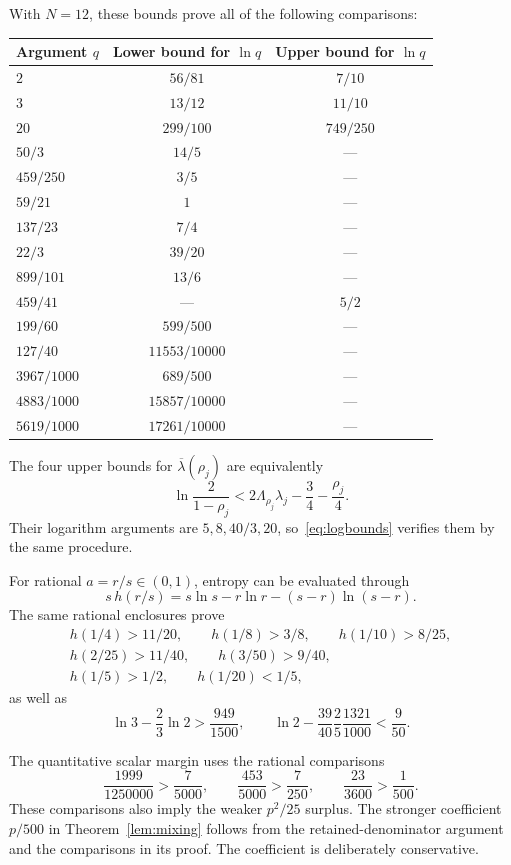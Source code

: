 With $N=12$, these bounds prove all of the following comparisons:
\begin{center}
\renewcommand{\arraystretch}{1.14}
\begin{tabular}{@{}lcc@{}}
\toprule
Argument $q$ & Lower bound for $\ln q$ & Upper bound for $\ln q$\\
\midrule
$2$ & $56/81$ & $7/10$\\
$3$ & $13/12$ & $11/10$\\
$20$ & $299/100$ & $749/250$\\
$50/3$ & $14/5$ & ---\\
$459/250$ & $3/5$ & ---\\
$59/21$ & $1$ & ---\\
$137/23$ & $7/4$ & ---\\
$22/3$ & $39/20$ & ---\\
$899/101$ & $13/6$ & ---\\
$459/41$ & --- & $5/2$\\
$199/60$ & $599/500$ & ---\\
$127/40$ & $11553/10000$ & ---\\
$3967/1000$ & $689/500$ & ---\\
$4883/1000$ & $15857/10000$ & ---\\
$5619/1000$ & $17261/10000$ & ---\\
\bottomrule
\end{tabular}
\end{center}
The four upper bounds for $\overline\lambda(\rho_j)$ are equivalently
\[
\ln\frac2{1-\rho_j}
<2\Lambda_{\rho_j}\lambda_j-\frac34-\frac{\rho_j}{4}.
\]
Their logarithm arguments are $5,8,40/3,20$, so~\eqref{eq:logbounds} verifies them by the same procedure.

For rational $a=r/s\in(0,1)$, entropy can be evaluated through
\[
s\,h(r/s)=s\ln s-r\ln r-(s-r)\ln(s-r).
\]
The same rational enclosures prove
\begin{gather*}
h(1/4)>11/20,\qquad h(1/8)>3/8,\qquad h(1/10)>8/25,\\
h(2/25)>11/40,\qquad h(3/50)>9/40,\\
h(1/5)>1/2,\qquad h(1/20)<1/5,
\end{gather*}
as well as
\[
\ln3-\frac23\ln2>\frac{949}{1500},\qquad
\ln2-\frac{39}{40}\frac25\frac{1321}{1000}<\frac9{50}.
\]

The quantitative scalar margin uses the rational comparisons
\[
\frac{1999}{1250000}>\frac7{5000},\qquad
\frac{453}{5000}>\frac7{250},\qquad
\frac{23}{3600}>\frac1{500}.
\]
These comparisons also imply the weaker $p^2/25$ surplus. The stronger coefficient $p/500$ in Theorem~\ref{lem:mixing} follows from the retained-denominator argument and the comparisons in its proof. The coefficient is deliberately conservative.



